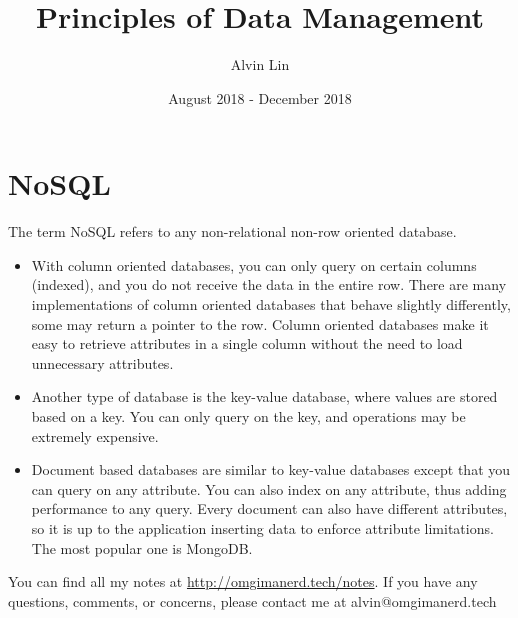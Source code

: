 \documentclass{math}
\title{Principles of Data Management}
\author{Alvin Lin}
\date{August 2018 - December 2018}
\begin{document}
\lstset{basicstyle=\ttfamily\footnotesize,breaklines=true}
\maketitle

\section*{NoSQL}
The term NoSQL refers to any non-relational non-row oriented database.
\begin{itemize}
  \item With column oriented databases, you can only query on certain columns
    (indexed), and you do not receive the data in the entire row. There are
    many implementations of column oriented databases that behave slightly
    differently, some may return a pointer to the row. Column oriented
    databases make it easy to retrieve attributes in a single column without
    the need to load unnecessary attributes.
  \item Another type of database is the key-value database, where values are
    stored based on a key. You can only query on the key, and operations may
    be extremely expensive.
  \item Document based databases are similar to key-value databases except
    that you can query on any attribute. You can also index on any attribute,
    thus adding performance to any query. Every document can also have different
    attributes, so it is up to the application inserting data to enforce
    attribute limitations. The most popular one is MongoDB.
\end{itemize}

\begin{center}
  You can find all my notes at \url{http://omgimanerd.tech/notes}. If you have
  any questions, comments, or concerns, please contact me at
  alvin@omgimanerd.tech
\end{center}
\end{document}
